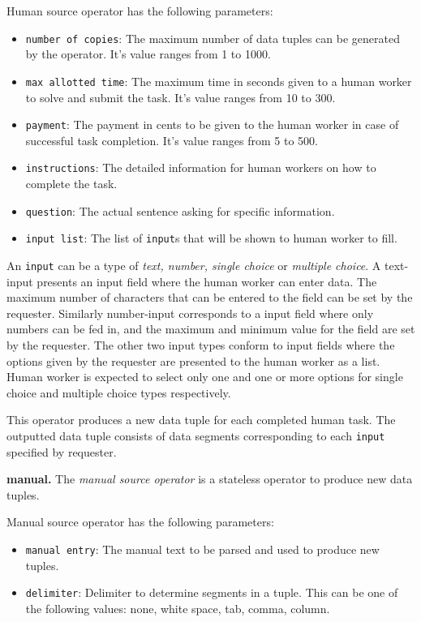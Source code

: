 Human source operator has the following parameters:
\begin{itemize}
	\item \texttt{number of copies}: The maximum number of data tuples can be 
	generated by the operator. It's value ranges from 1 to 1000.
	\item \texttt{max allotted time}: The maximum time in seconds given to a human 
	worker to solve and submit the task. It's value ranges from 10 to 300.
	\item \texttt{payment}: The payment in cents to be given to the human worker in 
	case of successful task completion. It's value ranges from 5 to 500.
	\item \texttt{instructions}: The detailed information for human workers on how to 
	complete the task.
	\item \texttt{question}: The actual sentence asking for specific information.
	\item \texttt{input list}: The list of \texttt{input}s that will be shown to human worker to fill.
\end{itemize}

An \texttt{input} can be a type of \textit{text, number, single choice} or 
\textit{multiple choice}. A text-input presents an input field where the human worker can 
enter data. The maximum number of characters that can be entered to the field can be 
set by the requester. Similarly number-input corresponds to a input field where only 
numbers can be fed in, and the maximum and minimum value for the field are set by 
the requester. The other two input types conform to input fields where the options given 
by the requester are presented to the human worker as a list. Human worker is expected 
to select only one and one or more options for single choice and multiple choice types 
respectively.

This operator produces a new data tuple for each completed human task. 
The outputted data tuple consists of data segments corresponding to 
each \texttt{input} specified by requester.


\textbf{manual.}
The \textit{manual source operator} is a stateless operator to produce new data 
tuples.

Manual source operator has the following parameters:
\begin{itemize}
	\item \texttt{manual entry}: The manual text to be parsed and used to produce 
	new tuples.
	\item \texttt{delimiter}: Delimiter to determine segments in a tuple. This can be one 
	of the following values: none, white space, tab, comma, column.
\end{itemize}

